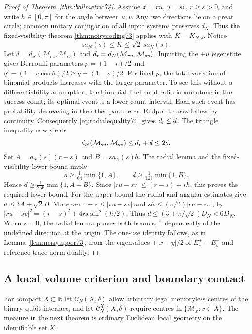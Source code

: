\begin{proof}[Proof of Theorem~\ref{thm:ballmetric74}]
Assume $x=ru$, $y=sv$, $r\ge s>0$, and write $h\in[0,\pi]$ for the
angle between $u,v$. Any two directions lie on a great circle; common
unitary conjugation of all input systems preserves $d_N$. Thus the
fixed-visibility theorem \ref{thm:noisycoding73} applies with
$K=K_{N,s}$. Notice
\begin{equation}\label{eq:angularweight74}
 sa_N(s)\le K\le\sqrt2\,sa_N(s).
\end{equation}
Let $d=d_N(\mathcal M_{ru},\mathcal M_{sv})$ and
$d_{\rm r}=d_N(\mathcal M_{ru},\mathcal M_{su})$.
Inputting the $+u$ eigenstate gives Bernoulli parameters
$p=(1-r)/2$ and $q'=(1-s\cos h)/2\ge q=(1-s)/2$.
For fixed $p$, the total variation of binomial products increases
with the larger parameter. To see this without a differentiability
assumption, the binomial likelihood ratio is monotone in the success
count; its optimal event is a lower count interval. Each such event
has probability decreasing in the other parameter. Endpoint cases
follow by continuity. Consequently \eqref{eq:radialequality74} gives
$d_{\rm r}\le d$. The triangle inequality now yields
\[
 d_N(\mathcal M_{su},\mathcal M_{sv})\le d_{\rm r}+d\le2d.
\]
Set $A=a_N(s)(r-s)$ and $B=sa_N(s)h$. The radial lemma and the
fixed-visibility lower bound imply
\[
 d\ge\tfrac1{64}\min\{1,A\},\qquad
 d\ge\tfrac1{128}\min\{1,B\}.
\]
Hence $d\ge\frac1{256}\min\{1,A+B\}$. Since
$|ru-sv|\le(r-s)+sh$, this proves the required lower bound.
For the upper bound the radial and angular estimates give
$d\le3A+\sqrt2 B$. Moreover $r-s\le|ru-sv|$ and
$sh\le(\pi/2)|ru-sv|$, by
$|ru-sv|^2=(r-s)^2+4rs\sin^2(h/2)$. Thus
$d\le(3+\pi/\sqrt2)D_N<6D_N$.
When $s=0$, the radial lemma proves both bounds, independently of the
undefined direction at the origin. The one-use identity follows, as
in Lemma~\ref{lem:noisyupper73}, from the eigenvalues
$\pm|x-y|/2$ of $E_x^+-E_y^+$ and reference trace-norm duality.
\end{proof}

\subsection{A local volume criterion and boundary contact}
For compact $X\subset\mathbb B$ let $\mathcal C_N(X,\delta)$ allow
arbitrary legal memoryless centres of the binary qubit interface, and
let $\mathcal C_N^X(X,\delta)$ require centres in
$\{\mathcal M_x:x\in X\}$. The measure in the next theorem is ordinary
Euclidean local geometry on the identifiable set $X$.

